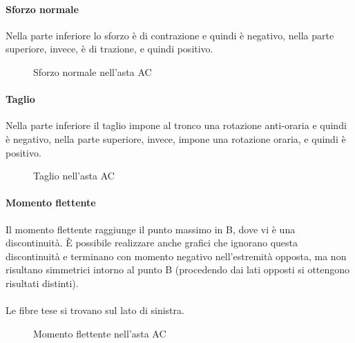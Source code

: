 \documentclass[main.tex]{subfiles}
\begin{document}
\paragraph{Sforzo normale}
Nella parte inferiore lo sforzo è di contrazione e quindi è negativo, nella parte superiore, invece, è di trazione, e quindi positivo.

\begin{figure}[H]
\centering
\resizebox{.25\textwidth}{!}{}
\caption{Sforzo normale nell'asta AC}
\end{figure}

\paragraph{Taglio}
Nella parte inferiore il taglio impone al tronco una rotazione anti-oraria e quindi è negativo, nella parte superiore, invece, impone una rotazione oraria, e quindi è positivo.

\begin{figure}[H]
\centering
\resizebox{.25\textwidth}{!}{}
\caption{Taglio nell'asta AC}
\end{figure}

\paragraph{Momento flettente}
Il momento flettente raggiunge il punto massimo in B, dove vi è una discontinuità. È possibile realizzare anche grafici che ignorano questa discontinuità e terminano con momento negativo nell'estremità opposta, ma non risultano simmetrici intorno al punto B (procedendo dai lati opposti si ottengono risultati distinti).
\\
\\
Le fibre tese si trovano sul lato di sinistra.

\begin{figure}[H]
\centering
\resizebox{.25\textwidth}{!}{}
\caption{Momento flettente nell'asta AC}
\end{figure}
\end{document}

